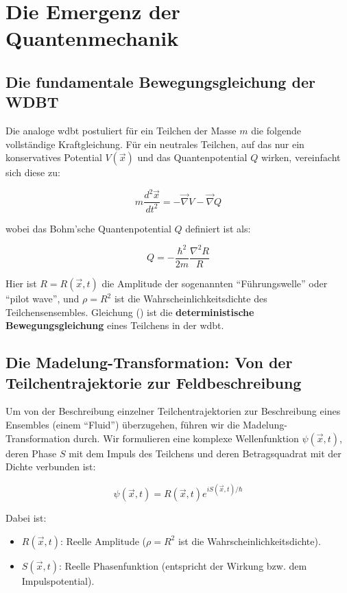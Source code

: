 \chapter{Die Emergenz der Quantenmechanik}
\section{Die fundamentale Bewegungsgleichung der WDBT}
Die analoge \gls{wdbt} postuliert für ein Teilchen der Masse $m$ die folgende vollständige Kraftgleichung. Für ein neutrales Teilchen, auf das nur ein konservatives Potential $V(\vec{x})$ und das
Quantenpotential $Q$ wirken, vereinfacht sich diese zu:

\begin{equation}
    \label{eq:deterministische_bewegungsgleichung}
    m \frac{d^2\vec{x}}{dt^2} = -\vec{\nabla} V - \vec{\nabla} Q
\end{equation}

wobei das Bohm'sche Quantenpotential $Q$ definiert ist als:

\begin{equation}
    Q = -\frac{\hbar^2}{2m} \frac{\nabla^2 R}{R}
\end{equation}

Hier ist $R = R(\vec{x},t)$ die Amplitude der sogenannten \enquote{Führungswelle} oder \enquote{pilot wave}, und $\rho = R^2$ ist die Wahrscheinlichkeitsdichte des Teilchensensembles. Gleichung
() ist die \textbf{deterministische Bewegungsgleichung} eines Teilchens in der \gls{wdbt}.

\section{Die Madelung-Transformation: Von der Teilchentrajektorie zur Feldbeschreibung}
Um von der Beschreibung einzelner Teilchentrajektorien zur Beschreibung eines Ensembles (einem \enquote{Fluid}) überzugehen, führen wir die Madelung-Transformation durch. Wir formulieren eine komplexe
Wellenfunktion $\psi(\vec{x}, t)$, deren Phase $S$ mit dem Impuls des Teilchens und deren Betragsquadrat mit der Dichte verbunden ist:

\begin{equation}
    \psi(\vec{x}, t) = R(\vec{x}, t)  e^{i S(\vec{x}, t) / \hbar}
\end{equation}

Dabei ist:

\begin{itemize}
    \item $R(\vec{x},t)$: Reelle Amplitude ($\rho = R^2$ ist die Wahrscheinlichkeitsdichte).
    \item $S(\vec{x},t)$: Reelle Phasenfunktion (entspricht der Wirkung bzw. dem Impulspotential).
\end{itemize}

